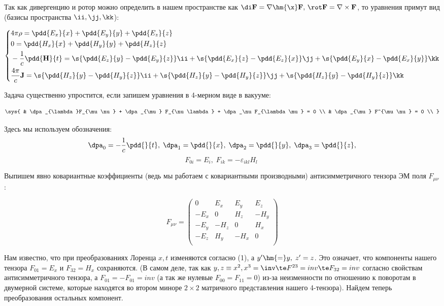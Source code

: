 \documentclass[12pt]{kiarticle}
\begin{document}
Так как дивергенцию и ротор можно определить в нашем пространстве как $ \di \mathbf{F} = \nabla \hm{\x} \mathbf{F}, \,  \rot \mathbf{F} = \nabla \times \mathbf{F} $, то уравнения примут вид (базисы пространства $ \ii, \jj, \kk $):

\begin{equation}
\left\{
\begin{aligned}
& 4\pi\rho = \pdd{E_x}{x} + \pdd{E_y}{y} + \pdd{E_z}{z} \\
&  0 =  \pdd{H_x}{x} + \pdd{H_y}{y} + \pdd{H_z}{z} \\
&  -\dfrac{1}{c}\pdd{\mathbf{H}}{t} =
\s{\pdd{E_z}{y} - \pdd{E_y}{z}}\ii +
\s{\pdd{E_x}{z} - \pdd{E_z}{x}}\jj +
\s{\pdd{E_y}{x} - \pdd{E_x}{y}}\kk 
\\
& \dfrac{4\pi}{c}\mathbf{J} =
\s{\pdd{H_z}{y} - \pdd{H_y}{z}}\ii +
\s{\pdd{H_z}{y} - \pdd{H_y}{z}}\jj +
\s{\pdd{H_z}{y} - \pdd{H_y}{z}}\kk 
\\
\end{aligned}
\right.
\end{equation}

Задача существенно упростится, если запишем уравнения в 4-мерном виде в вакууме:

\begin{equation}\label{}
\sys{
& \dpa_{\lambda}F_{\mu\nu} + \dpa_{\mu} F_{\nu\lambda} + \dpa_\nu F_{\lambda\mu} = 0 \\
& \dpa_{\mu} F^{\mu\nu} = 0 \\
}
\end{equation}

Здесь мы используем обозначения: 
\[ 
\dpa_0 = -\frac{1}{c}\pdd{}{t}, \; \dpa_1 = \pdd{}{x}, \; \dpa_2 = \pdd{}{y}, \; \dpa_3 = \pdd{}{z}, 
 \]
 \[ 
 F_{0i}  = E_i, \; F_{ik} = - \varepsilon_{ikl}H_l \; 
  \]

Выпишем явно ковариантные коэффициенты (ведь мы работаем с ковариантными производными) антисимметричного тензора ЭМ поля $ F_{\mu\nu} $:

\begin{equation}\label{}
F_{\mu\nu} =
\begin{pmatrix}
0 & E_x & E_y & E_z \\
-E_x & 0 & H_z & -H_y \\ 
-E_y & -H_z & 0 & H_x \\
-E_z & H_y& -H_x& 0 \\
\end{pmatrix} 
\end{equation}

Нам известно, что при преобразованиях Лоренца $ x, t $ изменяются согласно (1), а $ y' \hm{= }y, \; z' = z $. Это означает, что компоненты нашего тензора $ F_{01} = E_x $ и $ F_{32} = H_x $ сохраняются. (В самом деле, так как $ y,z \equiv x^2, x^3 = \inv  \te F^{23} = inv \te F_{32} = inv $ согласно свойствам антисимметричного тензора, а $ F_{01} = -F_{01} = inv $ (а так же нулевые $ F_{00} = F_{11} = 0 $) из-за неизменности по отношению к поворотам в двумерной системе, которые находятся во втором миноре $ 2 \times 2 $ матричного представления нашего 4-тензора). Найдем теперь преобразования остальных компонент.
\end{document}
